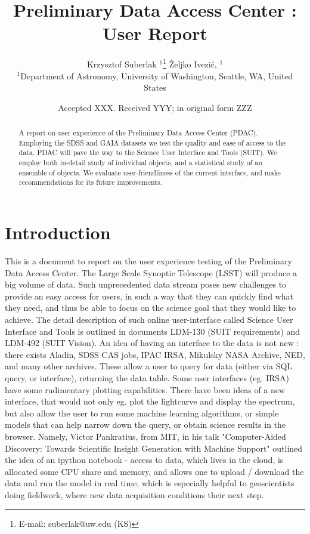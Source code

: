 \documentclass[fleqn,usenatbib]{mnras} %
\title[PDAC report]{Preliminary Data Access Center : User Report}
\author[K. Suberlak et al. ]{
Krzysztof Suberlak $^{1}$\thanks{E-mail: suberlak@uw.edu (KS)}
\v{Z}eljko Ivezi\'c, $^{1}$
\\
$^{1}$Department of Astronomy, University of Washington, Seattle, WA, United States\\
}
\date{Accepted XXX. Received YYY; in original form ZZZ}
\begin{document}
\label{firstpage}
\pagerange{\pageref{firstpage}--\pageref{lastpage}}
\maketitle

\begin{abstract}
A report on user experience of  the Preliminary Data Access Center (PDAC).  Employing the SDSS and GAIA datasets we test the quality and ease of access to the data. PDAC will pave the way to the Science User Interface and Tools  (SUIT).   We employ both in-detail study of individual objects, and a statistical study of an ensemble of objects. We evaluate user-friendliness of the current interface, and make recommendations for  its future improvements. 
\end{abstract}




\section{Introduction}

This is a document to report on the user experience testing of the Preliminary Data Access Center.  The Large Scale Synoptic Telescope (LSST)  will  produce a big volume of data. Such unprecedented data stream poses new challenges  to provide an easy access for users, in such a way that they can quickly find what they need, and thus be able to focus on the science goal that they would like to achieve.  The detail description of  such online user-interface called Science User Interface and Tools is outlined in documents LDM-130 (SUIT requirements)  and LDM-492  (SUIT Vision).  
An idea of having an interface to the data is not new : there exists Aladin,  SDSS CAS jobs,  IPAC  IRSA,  Mikulsky NASA Archive, NED, and many other archives. These allow a user to query for data (either via SQL query, or interface), returning the data table. Some user interfaces (eg. IRSA) have some rudimentary plotting capabilities.  There have been ideas of a new  interface, that would not only eg. plot the lightcurve and display the spectrum,  but also allow the user to run some machine learning algorithms, or simple models that can help narrow down the query, or obtain science results in the browser.  Namely, Victor Pankratius, from MIT, in his talk   "Computer-Aided Discovery: Towards Scientific Insight Generation with Machine Support"  outlined the idea of an ipython notebook - access to data, which lives in the cloud, is allocated some CPU  share and memory,  and allows one to upload / download the data and run the model in real time, which is especially helpful to geoscientists doing fieldwork, where new data acquisition conditions their next step.  
\end{document}
